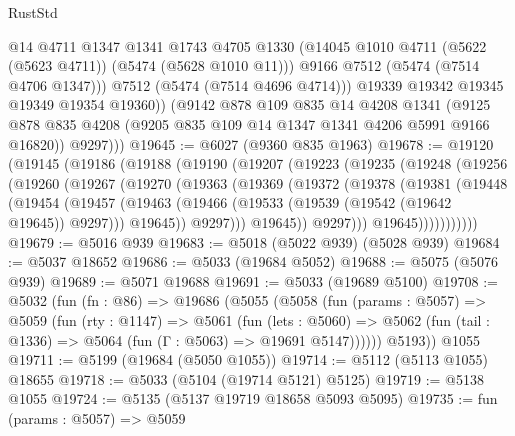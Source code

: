 \begin{lexlean}{RustStd}
\begin{coremodule}
                @14
                @4711
                @1347
                @1341
                @1743
                @4705
                @1330
                (@14045 @1010 @4711 (@5622 (@5623 @4711)) (@5474 (@5628 @1010 @11)))
                @9166
                @7512
                (@5474 (@7514 @4706 @1347)))
              @7512
              (@5474 (@7514 @4696 @4714)))
            @19339
            @19342
            @19345
            @19349
            @19354
            @19360))
        (@9142
          @878
          @109
          @835
          @14
          @4208
          @1341
          (@9125 @878 @835 @4208 (@9205 @835 @109 @14 @1347 @1341 @4206 @5991 @9166 @16820))
          @9297)))
@19645 := @6027 (@9360 @835 @1963)
@19678 := @19120
    (@19145
      (@19186
        (@19188
          (@19190
            (@19207
              (@19223
                (@19235
                  (@19248
                    (@19256
                      (@19260
                        (@19267
                          (@19270
                            (@19363
                              (@19369
                                (@19372
                                  (@19378
                                    (@19381
                                      (@19448
                                        (@19454
                                          (@19457
                                            (@19463
                                              (@19466
                                                (@19533 (@19539 (@19542 (@19642 @19645)) @9297)))
                                              @19645))
                                          @9297)))
                                    @19645))
                                @9297)))
                          @19645)))))))))))
@19679 := @5016 @939
@19683 := @5018 (@5022 @939) (@5028 @939)
@19684 := @5037 @18652
@19686 := @5033 (@19684 @5052)
@19688 := @5075 (@5076 @939)
@19689 := @5071 @19688
@19691 := @5033 (@19689 @5100)
@19708 := @5032
    (fun (fn : @86) =>
    @19686
      (@5055
        (@5058
          (fun (params : @5057) =>
          @5059
            (fun (rty : @1147) =>
            @5061
              (fun (lets : @5060) =>
              @5062 (fun (tail : @1336) => @5064 (fun (Γ : @5063) => @19691 @5147))))))
        @5193))
    @1055
@19711 := @5199 (@19684 (@5050 @1055))
@19714 := @5112 (@5113 @1055) @18655
@19718 := @5033 (@5104 (@19714 @5121) @5125)
@19719 := @5138 @1055
@19724 := @5135 (@5137 @19719 @18658 @5093 @5095)
@19735 := fun (params : @5057) =>
  @5059

\end{coremodule}
\end{lexlean}
